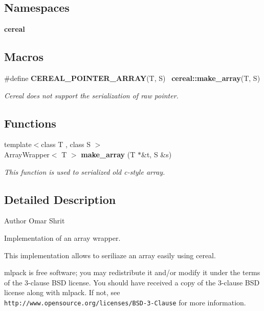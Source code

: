 \subsection*{Namespaces}
\begin{DoxyCompactItemize}
\item 
 \textbf{ cereal}
\end{DoxyCompactItemize}
\subsection*{Macros}
\begin{DoxyCompactItemize}
\item 
\#define \textbf{ C\+E\+R\+E\+A\+L\+\_\+\+P\+O\+I\+N\+T\+E\+R\+\_\+\+A\+R\+R\+AY}(T,  S)~\textbf{ cereal\+::make\+\_\+array}(T, S)
\begin{DoxyCompactList}\small\item\em Cereal does not support the serialization of raw pointer. \end{DoxyCompactList}\end{DoxyCompactItemize}
\subsection*{Functions}
\begin{DoxyCompactItemize}
\item 
{\footnotesize template$<$class T , class S $>$ }\\Array\+Wrapper$<$ T $>$ \textbf{ make\+\_\+array} (T $\ast$\&t, S \&s)
\begin{DoxyCompactList}\small\item\em This function is used to serialized old c-\/style array. \end{DoxyCompactList}\end{DoxyCompactItemize}


\subsection{Detailed Description}
\begin{DoxyAuthor}{Author}
Omar Shrit
\end{DoxyAuthor}
Implementation of an array wrapper.

This implementation allows to seriliaze an array easily using cereal.

mlpack is free software; you may redistribute it and/or modify it under the terms of the 3-\/clause B\+SD license. You should have received a copy of the 3-\/clause B\+SD license along with mlpack. If not, see {\tt http\+://www.\+opensource.\+org/licenses/\+B\+S\+D-\/3-\/\+Clause} for more information. 

